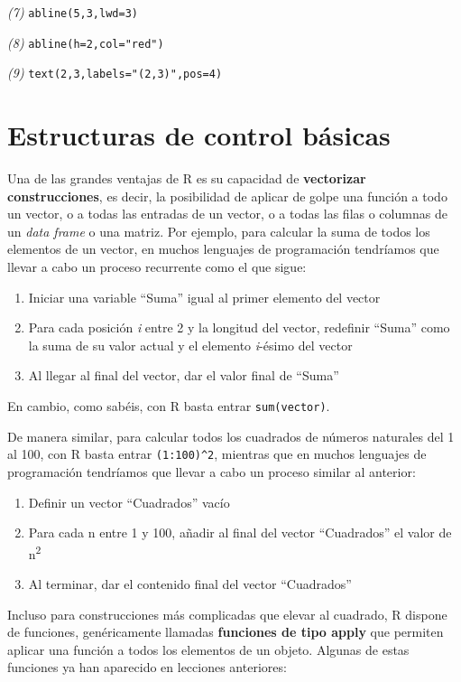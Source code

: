 \documentclass[]{book}
\providecommand{\tightlist}{%
  \setlength{\itemsep}{0pt}\setlength{\parskip}{0pt}}
\theoremstyle{definition}
\theoremstyle{definition}
\theoremstyle{definition}
\theoremstyle{remark}
\begin{document}
\emph{(7)} \texttt{abline(5,3,lwd=3)}

\emph{(8)} \texttt{abline(h=2,col="red")}

\emph{(9)} \texttt{text(2,3,labels="(2,3)",pos=4)}

\hypertarget{chap:for}{%
\chapter{Estructuras de control básicas}\label{chap:for}}

Una de las grandes ventajas de R es su capacidad de \textbf{vectorizar construcciones}, es decir, la posibilidad de aplicar de golpe una función a todo un vector, o a todas las entradas de un vector, o a todas las filas o columnas de un \emph{data frame} o una matriz. Por ejemplo, para calcular la suma de todos los elementos de un vector, en muchos lenguajes de programación tendríamos que llevar a cabo un proceso recurrente como el que sigue:

\begin{enumerate}
\def\labelenumi{\arabic{enumi}.}
\tightlist
\item
  Iniciar una variable ``Suma'' igual al primer elemento del vector
\item
  Para cada posición \emph{i} entre 2 y la longitud del vector, redefinir ``Suma'' como la suma de su valor actual y el elemento \emph{i}-ésimo del vector
\item
  Al llegar al final del vector, dar el valor final de ``Suma''
\end{enumerate}

En cambio, como sabéis, con R basta entrar \texttt{sum(vector)}.

De manera similar, para calcular todos los cuadrados de números naturales del 1 al 100, con R basta entrar \texttt{(1:100)\^{}2}, mientras que en muchos lenguajes de programación tendríamos que llevar a cabo un proceso similar al anterior:

\begin{enumerate}
\def\labelenumi{\arabic{enumi}.}
\tightlist
\item
  Definir un vector ``Cuadrados'' vacío
\item
  Para cada n entre 1 y 100, añadir al final del vector ``Cuadrados'' el valor de n\textsuperscript{2}
\item
  Al terminar, dar el contenido final del vector ``Cuadrados''
\end{enumerate}

Incluso para construcciones más complicadas que elevar al cuadrado, R dispone de funciones, genéricamente llamadas \textbf{funciones de tipo apply} que permiten aplicar una función a todos los elementos de un objeto. Algunas de estas funciones ya han aparecido en lecciones anteriores:
\end{document}
